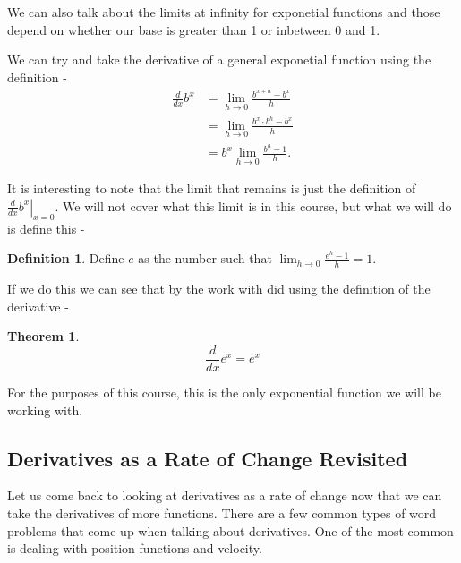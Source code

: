 \documentclass[12pt,reqno]{article}
\newtheorem{Theorem}{Theorem}
\theoremstyle{definition}
\newtheorem*{Definition}{Definition}
\begin{document}
We can also talk about the limits at infinity for exponetial functions and those depend on whether our base is greater than 1 or inbetween 0 and 1. 

We can try and take the derivative of a general exponetial function using the definition - 
\begin{align*}
	\frac{d}{dx} b^x &= \lim_{h \to 0} \frac{b^{x + h} - b^x}{h} \\
					 &= \lim_{h \to 0} \frac{b^x \cdot b^h - b^x}{h} \\
					 &= b^x \lim_{h \to 0} \frac{b^h - 1}{h}.
\end{align*}

It is interesting to note that the limit that remains is just the definition of $\left.\frac{d}{dx} b^x \right|_{x = 0}$. We will not cover what this limit is in this course, but what we will do is define this - 
\begin{Definition}
 Define $e$ as the number such that $\lim_{h \to 0} \frac{e^h - 1}{h} = 1$. 
\end{Definition}

If we do this we can see that by the work with did using the definition of the derivative - 
\begin{Theorem}
$$\frac{d}{dx} e^x = e^x$$
\end{Theorem}

For the purposes of this course, this is the only exponential function we will be working with. 

\subsection{Derivatives as a Rate of Change Revisited}

Let us come back to looking at derivatives as a rate of change now that we can take the derivatives of more functions. There are a few common types of word problems that come up when talking about derivatives. One of the most common is dealing with position functions and velocity. 
\end{document}

